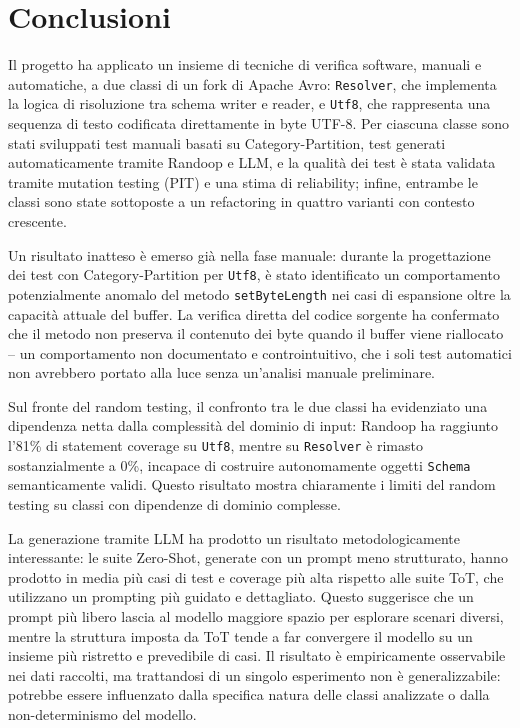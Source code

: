 \section{Conclusioni}

Il progetto ha applicato un insieme di tecniche di verifica software,
manuali e automatiche, a due classi di un fork di Apache Avro:
\texttt{Resolver}, che implementa la logica di risoluzione tra schema
writer e reader, e \texttt{Utf8}, che rappresenta una sequenza di
testo codificata direttamente in byte UTF-8. Per ciascuna classe sono
stati sviluppati test manuali basati su Category-Partition, test
generati automaticamente tramite Randoop e LLM, e la qualità dei test
è stata validata tramite mutation testing (PIT) e una stima di
reliability; infine, entrambe le classi sono state sottoposte a un
refactoring in quattro varianti con contesto crescente.

Un risultato inatteso è emerso già nella fase manuale: durante la
progettazione dei test con Category-Partition per \texttt{Utf8}, è
stato identificato un comportamento potenzialmente anomalo del metodo
\texttt{setByteLength} nei casi di espansione oltre la capacità
attuale del buffer. La verifica diretta del codice sorgente ha
confermato che il metodo non preserva il contenuto dei byte quando il
buffer viene riallocato -- un comportamento non documentato e
controintuitivo, che i soli test automatici non avrebbero portato
alla luce senza un'analisi manuale preliminare.

Sul fronte del random testing, il confronto tra le due classi ha
evidenziato una dipendenza netta dalla complessità del dominio di
input: Randoop ha raggiunto l'81\% di statement coverage su
\texttt{Utf8}, mentre su \texttt{Resolver} è rimasto sostanzialmente
a 0\%, incapace di costruire autonomamente oggetti \texttt{Schema}
semanticamente validi. Questo risultato mostra chiaramente i limiti
del random testing su classi con dipendenze di dominio complesse.

La generazione tramite LLM ha prodotto un risultato metodologicamente
interessante: le suite Zero-Shot, generate con un prompt meno
strutturato, hanno prodotto in media più casi di test e coverage più
alta rispetto alle suite ToT, che utilizzano un prompting più guidato
e dettagliato. Questo suggerisce che un prompt più libero lascia al
modello maggiore spazio per esplorare scenari diversi, mentre la
struttura imposta da ToT tende a far convergere il modello su un
insieme più ristretto e prevedibile di casi. Il risultato è
empiricamente osservabile nei dati raccolti, ma trattandosi di un
singolo esperimento non è generalizzabile: potrebbe essere
influenzato dalla specifica natura delle classi analizzate o dalla
non-determinismo del modello.
